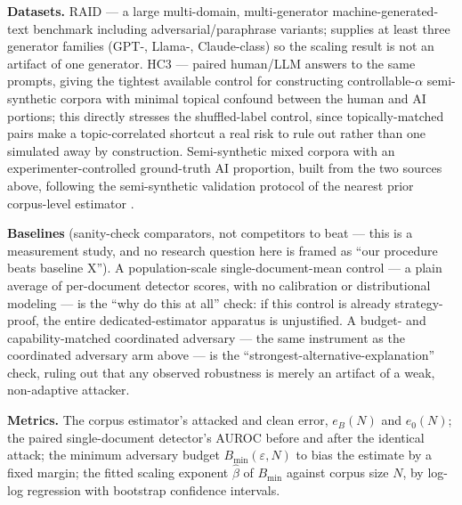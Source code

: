 \documentclass[11pt]{article}
\begin{document}
\textbf{Datasets.} RAID \citep{RAID2024} --- a large multi-domain, multi-generator machine-generated-text benchmark including adversarial/paraphrase variants; supplies at least three generator families (GPT-, Llama-, Claude-class) so the scaling result is not an artifact of one generator. HC3 \citep{HC32023} --- paired human/LLM answers to the same prompts, giving the tightest available control for constructing controllable-$\alpha$ semi-synthetic corpora with minimal topical confound between the human and AI portions; this directly stresses the shuffled-label control, since topically-matched pairs make a topic-correlated shortcut a real risk to rule out rather than one simulated away by construction. Semi-synthetic mixed corpora with an experimenter-controlled ground-truth AI proportion, built from the two sources above, following the semi-synthetic validation protocol of the nearest prior corpus-level estimator \citep{MonitorAIScale}.

\textbf{Baselines} (sanity-check comparators, not competitors to beat --- this is a measurement study, and no research question here is framed as ``our procedure beats baseline X''). A population-scale single-document-mean control --- a plain average of per-document detector scores, with no calibration or distributional modeling --- is the ``why do this at all'' check: if this control is already strategy-proof, the entire dedicated-estimator apparatus is unjustified. A budget- and capability-matched coordinated adversary --- the same instrument as the coordinated adversary arm above --- is the ``strongest-alternative-explanation'' check, ruling out that any observed robustness is merely an artifact of a weak, non-adaptive attacker.

\textbf{Metrics.} The corpus estimator's attacked and clean error, $e_B(N)$ and $e_0(N)$; the paired single-document detector's AUROC before and after the identical attack; the minimum adversary budget $B_{\min}(\varepsilon, N)$ to bias the estimate by a fixed margin; the fitted scaling exponent $\hat\beta$ of $B_{\min}$ against corpus size $N$, by log-log regression with bootstrap confidence intervals.
\end{document}
